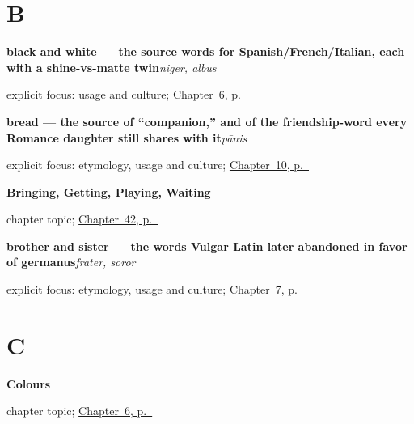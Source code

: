 \section*{B}

\noindent\begin{minipage}[t]{\linewidth}
\raggedright
\textbf{black and white — the source words for Spanish/French/Italian, each with a shine-vs-matte twin}\enspace\emph{niger, albus}\par
\footnotesize explicit focus: usage and culture; \hyperref[ch:la-colours]{Chapter~6, p.~\pageref*{ch:la-colours}}
\end{minipage}\par\smallskip

\noindent\begin{minipage}[t]{\linewidth}
\raggedright
\textbf{bread — the source of \textquotedblleft{}companion,\textquotedblright{} and of the friendship-word every Romance daughter still shares with it}\enspace\emph{pānis}\par
\footnotesize explicit focus: etymology, usage and culture; \hyperref[ch:la-water-wine-bread]{Chapter~10, p.~\pageref*{ch:la-water-wine-bread}}
\end{minipage}\par\smallskip

\noindent\begin{minipage}[t]{\linewidth}
\raggedright
\textbf{Bringing, Getting, Playing, Waiting}\par
\footnotesize chapter topic; \hyperref[ch:la-getting-and-waiting-verbs]{Chapter~42, p.~\pageref*{ch:la-getting-and-waiting-verbs}}
\end{minipage}\par\smallskip

\noindent\begin{minipage}[t]{\linewidth}
\raggedright
\textbf{brother and sister — the words Vulgar Latin later abandoned in favor of germanus}\enspace\emph{frater, soror}\par
\footnotesize explicit focus: etymology, usage and culture; \hyperref[ch:la-family]{Chapter~7, p.~\pageref*{ch:la-family}}
\end{minipage}\par\smallskip

\section*{C}

\noindent\begin{minipage}[t]{\linewidth}
\raggedright
\textbf{Colours}\par
\footnotesize chapter topic; \hyperref[ch:la-colours]{Chapter~6, p.~\pageref*{ch:la-colours}}
\end{minipage}\par\smallskip

